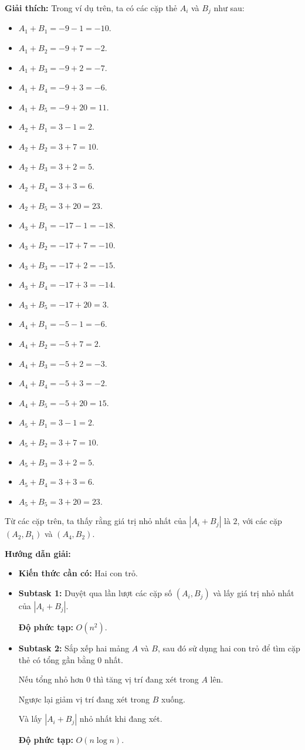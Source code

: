\documentclass[12pt]{scrartcl}  %
\begin{document}
\textbf{Giải thích:}
Trong ví dụ trên, ta có các cặp thẻ $A_i$ và $B_j$ như sau:
\begin{itemize}
    \item $A_1 + B_1 = -9 - 1 = -10$.
    \item $A_1 + B_2 = -9 + 7 = -2$.
    \item $A_1 + B_3 = -9 + 2 = -7$.
    \item $A_1 + B_4 = -9 + 3 = -6$.
    \item $A_1 + B_5 = -9 + 20 = 11$.
    \item $A_2 + B_1 = 3 - 1 = 2$.
    \item $A_2 + B_2 = 3 + 7 = 10$.
    \item $A_2 + B_3 = 3 + 2 = 5$.
    \item $A_2 + B_4 = 3 + 3 = 6$.
    \item $A_2 + B_5 = 3 + 20 = 23$.
    \item $A_3 + B_1 = -17 - 1 = -18$.
    \item $A_3 + B_2 = -17 + 7 = -10$.
    \item $A_3 + B_3 = -17 + 2 = -15$.
    \item $A_3 + B_4 = -17 + 3 = -14$.
    \item $A_3 + B_5 = -17 + 20 = 3$.
    \item $A_4 + B_1 = -5 - 1 = -6$.
    \item $A_4 + B_2 = -5 + 7 = 2$.
    \item $A_4 + B_3 = -5 + 2 = -3$.
    \item $A_4 + B_4 = -5 + 3 = -2$.
    \item $A_4 + B_5 = -5 + 20 = 15$.
    \item $A_5 + B_1 = 3 - 1 = 2$.
    \item $A_5 + B_2 = 3 + 7 = 10$.
    \item $A_5 + B_3 = 3 + 2 = 5$.
    \item $A_5 + B_4 = 3 + 3 = 6$.
    \item $A_5 + B_5 = 3 + 20 = 23$.
\end{itemize}
Từ các cặp trên, ta thấy rằng giá trị nhỏ nhất của $|A_i + B_j|$ là $2$, với các cặp $(A_2, B_1)$ và $(A_4, B_2)$.

\textbf{Hướng dẫn giải:}
\begin{itemize}
    \item \textbf{Kiến thức cần có:} Hai con trỏ.
    \item \textbf{Subtask 1:} Duyệt qua lần lượt các cặp số $(A_i, B_j)$ và lấy giá trị nhỏ
    nhất của $|A_i + B_j|$.

    \textbf{Độ phức tạp:} $O(n^2)$.
    \item \textbf{Subtask 2:} Sắp xếp hai mảng $A$ và $B$, sau đó sử dụng hai con trỏ
    để tìm cặp thẻ có tổng gần bằng $0$ nhất.

    Nếu tổng nhỏ hơn $0$ thì tăng vị trí đang xét trong $A$ lên.
    
    Ngược lại giảm vị trí đang xét trong $B$ xuống.

    Và lấy $|A_i + B_j|$ nhỏ nhất khi đang xét.

    \textbf{Độ phức tạp:} $O(n \log n)$.
\end{itemize}
\end{document}
